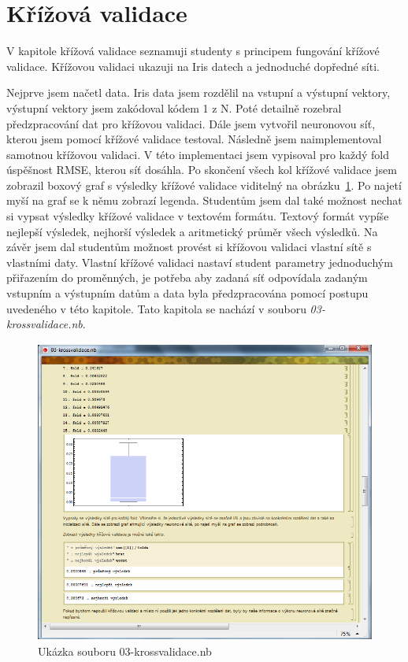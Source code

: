 \documentclass[11pt,twoside,a4paper]{book}
\begin{document}
\section{Křížová validace}
V kapitole křížová validace seznamuji studenty s principem fungování křížové validace. Křížovou validaci ukazuji na Iris datech a jednoduché dopředné síti.

Nejprve jsem načetl data. Iris data jsem rozdělil na vstupní a výstupní vektory, výstupní vektory jsem zakódoval kódem 1 z N. Poté detailně rozebral předzpracování dat pro křížovou validaci. Dále jsem vytvořil neuronovou síť, kterou jsem pomocí křížové validace testoval. Následně jsem naimplementoval samotnou křížovou validaci. V této implementaci jsem vypisoval pro každý fold úspěšnost RMSE, kterou síť dosáhla. Po skončení všech kol křížové validace jsem zobrazil boxový graf s výsledky křížové validace viditelný na obrázku~\ref{fig:krossvalidace}. Po najetí myší na graf se k němu zobrazí legenda. Studentům jsem dal také možnost nechat si vypsat výsledky křížové validace v textovém formátu. Textový formát vypíše nejlepší výsledek, nejhorší výsledek a aritmetický průměr všech výsledků. Na závěr jsem dal studentům možnost provést si křížovou validaci vlastní sítě s vlastními daty. Vlastní křížové validaci nastaví student parametry jednoduchým přiřazením do proměnných, je potřeba aby  zadaná síť odpovídala zadaným vstupním a výstupním datům a data byla předzpracována pomocí postupu uvedeného v této kapitole. Tato kapitola se nachází v souboru \textit{03-krossvalidace.nb}.

\begin{figure}[h!]
\begin{center}
\includegraphics[height=10cm]{figures/ukazka03.png}
\caption{Ukázka souboru 03-krossvalidace.nb}
\label{fig:krossvalidace}
\end{center}
\end{figure}
\end{document}
